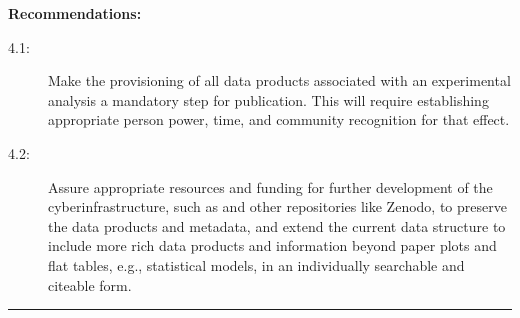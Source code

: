 \documentclass[11pt]{article}
\begin{document}
\noindent
\textbf{Recommendations:}
\begin{description}
  \item[4.1:] Make the provisioning of all data products associated with an experimental analysis a mandatory step for publication.
  This will require establishing appropriate person power, time, and community recognition for that effect.
   \item[4.2:] Assure appropriate resources and funding for further development of the cyberinfrastructure, such as \hepdata and other repositories like Zenodo, to preserve the data products and metadata, and extend the current data structure to include more rich data products and information beyond paper plots and flat tables, e.g., statistical models, in an individually searchable and citeable form.
\end{description}




\hrule 


\end{document}
